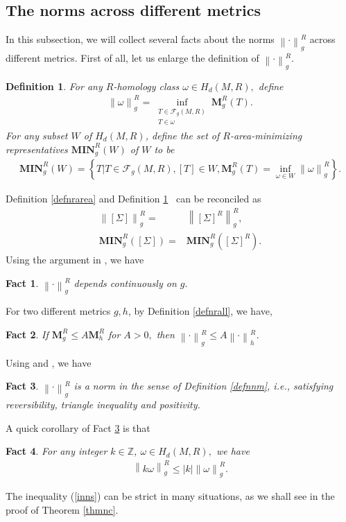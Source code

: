 \documentclass[11pt,a4paper]{amsart}
\numberwithin{equation}{section}
\newcommand{\mn}{\mathbf{MIN}}
\newcommand{\om}{\omega}
\newcommand{\Si}{\Sigma}
\newcommand{\ms}{\mathbf{M}}
\newcommand{\no}[1]{\left\lVert#1\right\rVert}
\newcommand{\Z}{\mathbb{Z}}
\theoremstyle{plain}
\newtheorem{fact}{Fact}[subsection]
\newtheorem{defn}{Definition}[subsection]
\theoremstyle{definition}
\numberwithin{equation}{subsection}
\begin{document}
	\subsection{The norms across different metrics}\label{ssnorm}In this subsection, we will collect several facts about the norms $\no{\cdot}^R_g$ across different metrics. First of all, let us enlarge the definition of $\no{\cdot}^R_g.$ 
	\begin{defn}\label{defnrareaall}
	For any $R$-homology class $\omega\in H_d(M,R),$ define	\begin{align}\label{defnrall}
		\no{\om}^R_g=\inf_{\substack{T\in\mathcal{F}_g(M,R)\\ T\in\om}}\ms_g^R(T).
	\end{align}
For any subset $W$ of $H_d(M,R)$, define the set of $R$-area-minimizing representatives $\mn_g^R(W)$ of $W$ to be
	\begin{align*}
		\mn_g^R\left(W\right)=\left\{T\bigg|T\in \mathcal{F}_g(M,R),[T]\in W,\ms^R_g(T)=\inf_{\om\in W}\no{\om}^R_g\right\}.
	\end{align*} 
	\end{defn}
	Definition \ref{defnrarea} and Definition \ref{defnrareaall}  can be reconciled as
	\begin{align*}
	\no{[\Si]}_g^R=&\no{[\Si]^R}^R_g,\\
	\mn_g^R\left([\Si]\right)=&\mn_g^R\left([\Si]^R\right).
	\end{align*}
	Using the argument in \cite[34.5 Theorem]{LS}, we have
	\begin{fact}\label{fctnr}
	$\no{\cdot}^R_g$ depends continuously on $g.$
	\end{fact}
	For two different metrics $g,h$, by Definition \ref{defnrall}, we have,
	\begin{fact}\label{fctmca}
	If  $\ms_g^R\le A\ms_h^R$ for $A>0,$ then $\no{\cdot}_g^R\le A\no{\cdot}_h^R$. 
	\end{fact}
	Using \cite{HFrf} and \cite[Chapter 5]{HF}, we have
	\begin{fact}\label{factnorm}
	$\no{\cdot}^R_g$ is a norm in the sense of Definition \ref{defnnm}, i.e., satisfying reversibility, triangle inequality and positivity.
	\end{fact} 
	A quick corollary of Fact \ref{factnorm} is that
	\begin{fact}
	For any integer $k\in \Z$, $\om\in H_d(M,R),$ we have
	\begin{align}\label{inns}
		\no{k\om}_g^R\le |k|\no{\om}_g^R.
	\end{align}
	\end{fact}
	The inequality (\ref{inns}) can be strict in many situations, as we shall see in the proof of Theorem \ref{thmnc}.
	
\end{document}
